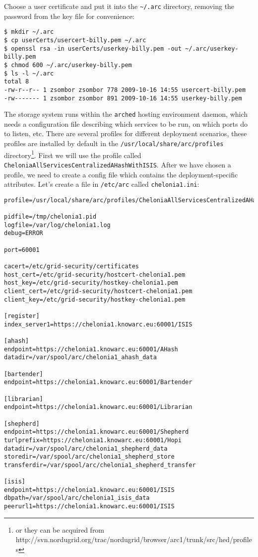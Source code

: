 \documentclass{article}
\begin{document}
Choose a user certificate and put it into the \verb!~/.arc! directory, removing the password from the key file for convenience:

\begin{verbatim}
$ mkdir ~/.arc
$ cp userCerts/usercert-billy.pem ~/.arc
$ openssl rsa -in userCerts/userkey-billy.pem -out ~/.arc/userkey-billy.pem
$ chmod 600 ~/.arc/userkey-billy.pem
$ ls -l ~/.arc
total 8
-rw-r--r-- 1 zsombor zsombor 778 2009-10-16 14:55 usercert-billy.pem
-rw------- 1 zsombor zsombor 891 2009-10-16 14:55 userkey-billy.pem
\end{verbatim}

The storage system runs within the \verb!arched! hosting environment daemon, which needs a configuration file describing which services to be run, on which ports do to listen, etc. There are several profiles for different deployment scenarios, these profiles are installed by default in the \verb!/usr/local/share/arc/profiles! directory\footnote{or they can be acquired from http://svn.nordugrid.org/trac/nordugrid/browser/arc1/trunk/src/hed/profiles}. First we will use the profile called \verb!CheloniaAllServicesCentralizedAHashWithISIS!. After we have chosen a profile, we need to create a config file which contains the deployment-specific attributes. Let's create a file in \verb!/etc/arc! called \verb!chelonia1.ini!:

\begin{verbatim}
profile=/usr/local/share/arc/profiles/CheloniaAllServicesCentralizedAHashWithISIS.xml

pidfile=/tmp/chelonia1.pid
logfile=/var/log/chelonia1.log
debug=ERROR

port=60001

cacert=/etc/grid-security/certificates
host_cert=/etc/grid-security/hostcert-chelonia1.pem
host_key=/etc/grid-security/hostkey-chelonia1.pem
client_cert=/etc/grid-security/hostcert-chelonia1.pem
client_key=/etc/grid-security/hostkey-chelonia1.pem

[register]
index_server1=https://chelonia1.knowarc.eu:60001/ISIS

[ahash]
endpoint=https://chelonia1.knowarc.eu:60001/AHash
datadir=/var/spool/arc/chelonia1_ahash_data

[bartender]
endpoint=https://chelonia1.knowarc.eu:60001/Bartender

[librarian]
endpoint=https://chelonia1.knowarc.eu:60001/Librarian

[shepherd]
endpoint=https://chelonia1.knowarc.eu:60001/Shepherd
turlprefix=https://chelonia1.knowarc.eu:60001/Hopi
datadir=/var/spool/arc/chelonia1_shepherd_data
storedir=/var/spool/arc/chelonia1_shepherd_store
transferdir=/var/spool/arc/chelonia1_shepherd_transfer

[isis]
endpoint=https://chelonia1.knowarc.eu:60001/ISIS
dbpath=/var/spool/arc/chelonia1_isis_data
peerurl1=https://chelonia1.knowarc.eu:60001/ISIS
\end{verbatim}
\end{document}
